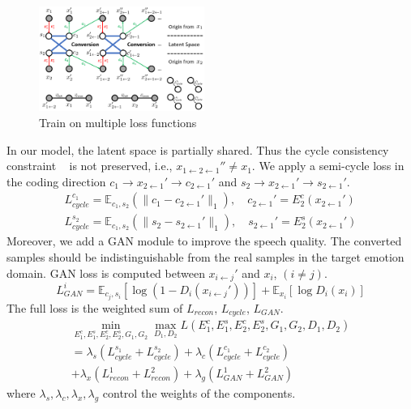 \documentclass{article}
\begin{document}
\begin{figure}[htb]
\includegraphics[width=0.48\textwidth]{FIG/loss}
\caption{Train on multiple loss functions}
\label{loss}
\end{figure}

In our model, the latent space is partially shared. Thus the cycle consistency constraint ~\cite{Zhu_2017_ICCV} is not preserved, i.e., $x_{1\leftarrow2\leftarrow1}'' \neq x_1$. We apply a semi-cycle loss in the coding direction $c_1 \rightarrow x_{2\leftarrow1}' \rightarrow c_{2\leftarrow1}'$ and $s_2 \rightarrow x_{2\leftarrow1}' \rightarrow s_{2\leftarrow1}'$.
\begin{equation}
\begin{aligned}
L_{cycle}^{c_1} = \mathbb{E}_{c_1, s_2} (\| c_1 - c_{2\leftarrow1}' \|_1), \quad c_{2\leftarrow1}'=E_2^c(x_{2\leftarrow1}') \\
L_{cycle}^{s_2} = \mathbb{E}_{c_1, s_2} (\| s_2 - s_{2\leftarrow1}' \|_1), \quad s_{2\leftarrow1}'=E_2^s(x_{2\leftarrow1}')
\end{aligned}
\end{equation}
Moreover, we add a GAN module to improve the speech quality. The converted samples should be indistinguishable from the real samples in the target emotion domain. GAN loss is computed between $x_{i\leftarrow j}'$ and $x_i$, $(i \neq j)$.
\begin{equation}
L_{GAN}^i = \mathbb{E}_{c_j, s_i}[\log(1-D_i(x_{i\leftarrow j}'))] + \mathbb{E}_{x_i}[\log D_i(x_i)]
\end{equation}
The full loss is the weighted sum of $L_{recon}$, $L_{cycle}$, $L_{GAN}$.
\begin{equation}
\begin{aligned}
\min_{E_1^c,E_1^s,E_2^c,E_2^s, G_1,G_2}\max_{D_1,D_2} L(E_1^c, E_1^s, E_2^c, E_2^s, G_1, G_2, D_1, D_2) \\
= \lambda_s (L_{cycle}^{s_1} + L_{cycle}^{s_2}) + \lambda_c (L_{cycle}^{c_1} + L_{cycle}^{c_2}) \ \qquad \qquad \\
+ \lambda_x (L_{recon}^1 + L_{recon}^2) + \lambda_g (L_{GAN}^1 + L_{GAN}^2) \qquad \quad
\end{aligned}
\end{equation}
where $\lambda_s, \lambda_c, \lambda_x, \lambda_g$ control the weights of the components.
\end{document}
